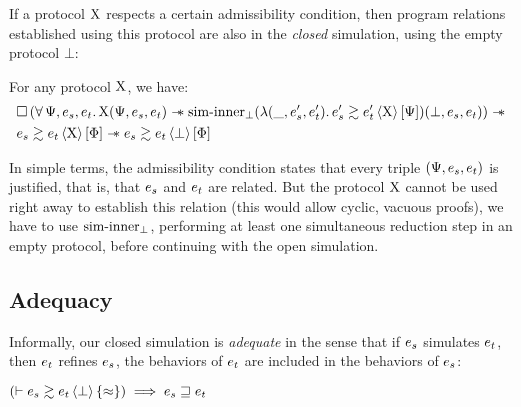 If a protocol $\mathrm{X}$ respects a certain admissibility condition, then program relations established using this protocol are also in the \emph{closed} simulation, using the empty protocol $\bot$:
\begin{lemma}
\label{lem:closure}
  For any protocol $\mathrm{X}$, we have:
    \begin{align*}
            &
            \iPersistent \left(
                \forall \iPredTwo, \datalangExpr_s, \datalangExpr_t \ldotp
                \iProt (\iPredTwo, \datalangExpr_s, \datalangExpr_t) \iWand
                \mathrm{sim \mathhyphen inner}_\bot (\lambdaAbs (\_, \datalangExpr_s', \datalangExpr_t') \ldotp \iSim[\iProt]{\iPredTwo}{\datalangExpr_s'}{\datalangExpr_t'}) (\bot, \datalangExpr_s, \datalangExpr_t)
            \right) \iWand
        \\
            &
            \iSim[\iProt]{\iPred}{\datalangExpr_s}{\datalangExpr_t} \iWand
            \iSim[\bot]{\iPred}{\datalangExpr_s}{\datalangExpr_t}
    \end{align*}
\end{lemma}

In simple terms, the admissibility condition states that every triple $(\iPredTwo, \datalangExpr_s, \datalangExpr_t)$ is justified, that is, that $\datalangExpr_s$ and $\datalangExpr_t$ are related.
But the protocol $\mathrm{X}$ cannot be used right away to establish this relation (this would allow cyclic, vacuous proofs), we have to use $\mathrm{sim {\hbox{-}} inner}_\bot$, performing at least one simultaneous reduction step in an empty protocol, before continuing with the open simulation.

\subsection{Adequacy}



Informally, our closed simulation is \emph{adequate} in the sense that if $\datalangExpr_s$ simulates $\datalangExpr_t$, then $\datalangExpr_t$ refines $\datalangExpr_s$, \ie the behaviors of $\datalangExpr_t$ are included in the behaviors of $\datalangExpr_s$:

\begin{lemma} \label{thm:adequacy}
    $
        \left( \vdash \iSimv[\bot]{\iSimilar}{\datalangExpr_s}{\datalangExpr_t} \right) \implies
        \datalangExpr_s \refined \datalangExpr_t
    $
\end{lemma}

